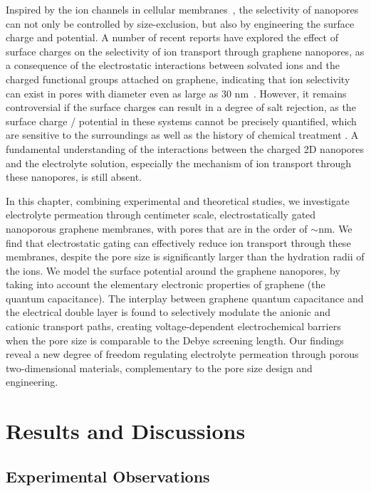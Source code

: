 Inspired by the ion channels in cellular
membranes~\autocite{Chung_2007_biological_ion_chan}, the selectivity of
nanopores can not only be controlled by size-exclusion, but also by
engineering the surface charge and potential.
%
A number of recent reports have explored the effect of surface charges
on the selectivity of ion transport through graphene nanopores, as a
consequence of the electrostatic interactions between solvated ions
and the charged functional groups attached on graphene, indicating
that ion selectivity can exist in pores with diameter even as large
as 30 nm~\autocite{Rollings_2016_gating,Surwade_2014_carbon_electrochemical_ion}.
%
However, it remains controversial if the surface charges can result in
a degree of salt rejection, as the surface charge / potential in these systems
cannot be precisely quantified, which are sensitive to the surroundings
as well as the history of chemical treatment
\autocite{Li_2008_gr_suspension}.
%
A fundamental understanding of the interactions between the charged 2D
nanopores and the electrolyte solution, especially the mechanism of
ion transport through these nanopores, is still absent.

In this chapter, combining experimental and theoretical studies, we
investigate electrolyte permeation through centimeter scale,
electrostatically gated nanoporous graphene membranes, with pores that
are in the order of $\sim{}$\unit[20]{nm}.
%
We find that electrostatic gating can effectively reduce ion transport
through these membranes, despite the pore size is significantly larger
than the hydration radii of the ions. We model the surface potential
around the graphene nanopores, by taking into account the elementary
electronic properties of graphene (\eg the quantum capacitance).
%
The interplay between graphene quantum capacitance and the electrical
double layer is found to selectively modulate the anionic and cationic
transport paths, creating voltage-dependent electrochemical barriers
when the pore size is comparable to the Debye screening length. Our findings
reveal a new degree of freedom regulating electrolyte permeation
through porous two-dimensional materials, complementary to the pore
size design and engineering.

\section{Results and Discussions}
\label{sec:np-np-res}

\subsection{Experimental Observations}
\label{sec:np-np-exper-observ}

